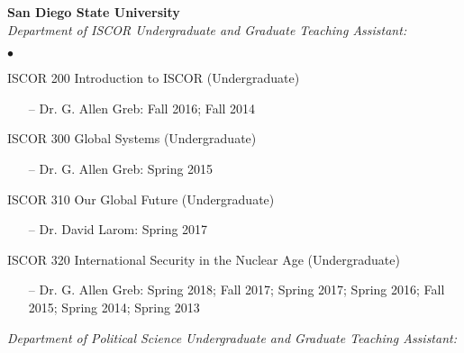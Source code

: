 \documentclass[letterpaper,12pt]{article}
\newenvironment{list2}{
  \begin{list}{$\bullet$}{%
      \setlength{\itemsep}{0in}
      \setlength{\parsep}{0in} 
      \setlength{\parskip}{0in}
      \setlength{\topsep}{0in} 
      \setlength{\partopsep}{0in}
      \setlength{\leftmargin}{1in}
      \setlength{\labelsep}{1em}
      \setlength{\labelwidth}{1em}
      \setlength{\itemindent}{-2em}
      \setlength{\listparindent}{2em}}}{\end{list}}
\begin{document}
\par
\textbf{San Diego State University}\\
\textit{Department of ISCOR Undergraduate and Graduate Teaching Assistant:}
\begin{list2}
    \item ISCOR 200 Introduction to ISCOR (Undergraduate)
        \begin{enumerate}[leftmargin=!,labelindent=0pt,itemindent=-15pt]
            \item[--] Dr. G. Allen Greb: Fall 2016; Fall 2014
        \end{enumerate}
    \item ISCOR 300 Global Systems (Undergraduate)
        \begin{enumerate}[leftmargin=!,labelindent=0pt,itemindent=-15pt]
            \item[--] Dr. G. Allen Greb: Spring 2015
        \end{enumerate}
    \item ISCOR 310 Our Global Future (Undergraduate)
        \begin{enumerate}[leftmargin=!,labelindent=0pt,itemindent=-15pt]
            \item[--] Dr. David Larom: Spring 2017
        \end{enumerate}
    \item ISCOR 320 International Security in the Nuclear Age (Undergraduate)
        \begin{enumerate}[leftmargin=!,labelindent=0pt,itemindent=-15pt]
            \item[--]  Dr. G. Allen Greb: Spring 2018; Fall 2017; Spring 2017; Spring 2016; Fall 2015; Spring 2014; Spring 2013
        \end{enumerate}
\end{list2}
\par
\textit{Department of Political Science Undergraduate and Graduate Teaching Assistant:}
\end{document}
